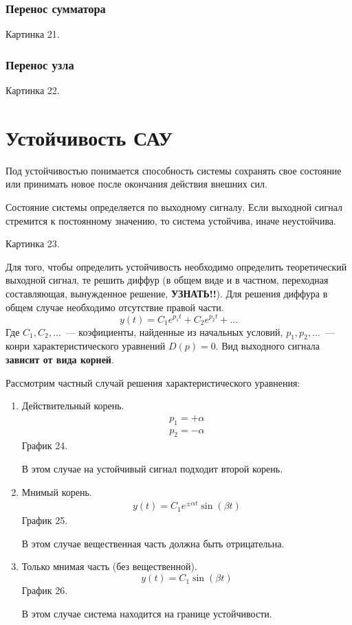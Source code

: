 \subsubsection{Перенос сумматора}
Картинка 21.
\subsubsection{Перенос узла}
Картинка 22.

\section{Устойчивость САУ}
Под устойчивостью понимается способность системы сохранять свое состояние или принимать новое после окончания действия внешних сил.

Состояние системы определяется по выходному сигналу. Если выходной сигнал стремится к постоянному значению, то система устойчива, иначе неустойчива.

Картинка 23.

Для того, чтобы определить устойчивость необходимо определить теоретический выходной сигнал, те решить диффур (в общем виде и в частном, переходная составляющая, вынужденное решение, \textbf{УЗНАТЬ!!}). Для решения диффура в общем случае необходимо отсутствие правой части.
$$
	y(t)=C_1e^{p_1t}+C_2e^{p_2t}+\ldots
$$
Где $C_1, C_2,\ldots$~--- коэфициенты, найденные из начальных условий, $p_1,p_2,\ldots$~--- конри характеристического уравнений $D(p)=0$. Вид выходного сигнала \textbf{зависит от вида корней}.

Рассмотрим частный случай решения характеристического уравнения:
\begin{enumerate}
	\item 
	Действительный корень.
	\begin{gather*}
		p_1 = +\alpha\\
		p_2 = -\alpha
	\end{gather*}
	График 24.
	
	В этом случае на устойчивый сигнал подходит второй корень.
	\item
	Мнимый корень.
	\begin{gather*}
		y(t) = C_1e^{\pm\alpha{}t}\sin(\beta{}t)
	\end{gather*}
	График 25.
	
	В этом случае вещественная часть должна быть отрицательна.
	\item
	Только мнимая часть (без вещественной).
	$$y(t)=C_1\sin(\beta{}t)$$
	График 26.
	
	В этом случае система находится на границе устойчивости.
\end{enumerate}


